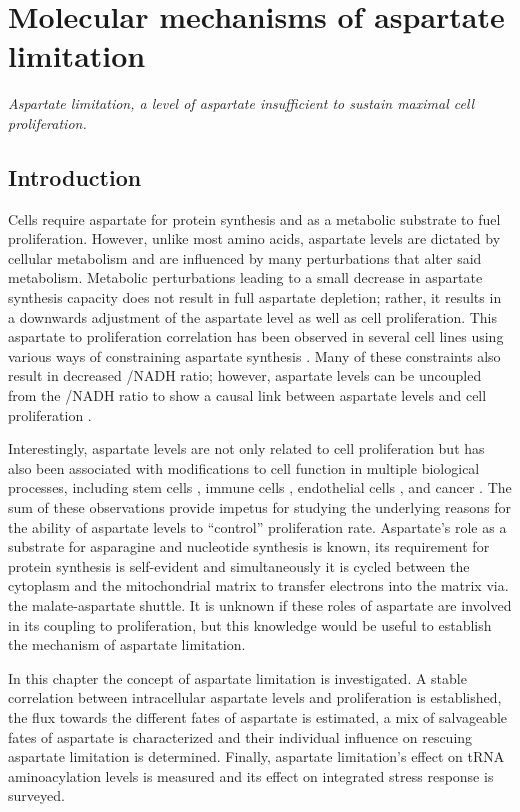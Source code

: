 \chapter{Molecular mechanisms of aspartate limitation}
\label{chap2}
\textit{Aspartate limitation, a level of aspartate insufficient to sustain maximal cell proliferation.}


\section{Introduction}
Cells require aspartate for protein synthesis and as a metabolic substrate to fuel proliferation.
However, unlike most amino acids, aspartate levels are dictated by cellular metabolism and are influenced by many perturbations that alter said metabolism.
Metabolic perturbations leading to a small decrease in aspartate synthesis capacity does not result in full aspartate depletion; rather, it results in a downwards adjustment of the aspartate level as well as cell proliferation.
This aspartate to proliferation correlation has been observed in several cell lines using various ways of constraining aspartate synthesis \cite{Sullivan2015-xf, Birsoy2015-pg, Gui2016-ca}.
Many of these constraints also result in decreased \NAD{}/NADH ratio; however, aspartate levels can be uncoupled from the \NAD{}/NADH ratio to show a causal link between aspartate levels and cell proliferation \cite{Sullivan2018-gz, Garcia-Bermudez2018-mj}.

Interestingly, aspartate levels are not only related to cell proliferation but has also been associated with modifications to cell function in multiple biological processes, including stem cells \cite{Tournaire2022-ut, Arnold2022-ft}, immune cells \cite{Bailis2019-mf}, endothelial cells \cite{Diebold2019-hh}, and cancer \cite{Helenius2021-ht}.
The sum of these observations provide impetus for studying the underlying reasons for the ability of aspartate levels to ``control'' proliferation rate.
Aspartate's role as a substrate for asparagine and nucleotide synthesis is known, its requirement for protein synthesis is self-evident and simultaneously it is cycled between the cytoplasm and the mitochondrial matrix to transfer electrons into the matrix via. the malate-aspartate shuttle.
It is unknown if these roles of aspartate are involved in its coupling to proliferation, but this knowledge would be useful to establish the mechanism of aspartate limitation.

In this chapter the concept of aspartate limitation is investigated.
A stable correlation between intracellular aspartate levels and proliferation is established, the flux towards the different fates of aspartate is estimated, a mix of salvageable fates of aspartate is characterized and their individual influence on rescuing aspartate limitation is determined.
Finally, aspartate limitation's effect on tRNA aminoacylation levels is measured and its effect on integrated stress response is surveyed.




